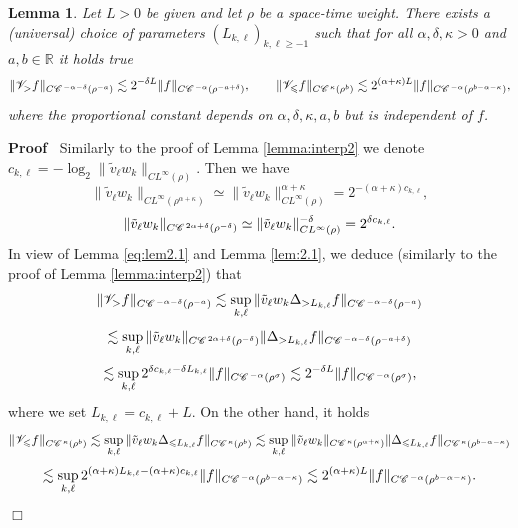 \documentclass[a4paper,11pt]{article}
\renewcommand{\geq}{\geqslant}
\newenvironment{proof}{\noindent\textbf{Proof\ }}{\hspace*{\fill}$\Box$\medskip}
\newtheorem{lemma}[theorem]{Lemma}
\numberwithin{equation}{section}
\newcommand{\CC}{\mathscr{C} \hspace{.1em}}
\newcommand{\VV}{\mathscr{V}}
\newcommand{\R}{\mathbb{R}}
\newcommand{\8}{\infty}
\begin{document}
\begin{lemma}\label{lem:local2}
Let $L>0$ be given and  let $\rho$ be a space-time weight. There exists a (universal) choice of parameters $(L_{k,\ell})_{k,\ell\geq -1}$ such that for all $\alpha,\delta,\kappa>0$ and $a,b\in\R$ it holds true
      \[ \| \VV_{>} f \|_{C\CC^{- \alpha - \delta} (\rho^{- a})} \lesssim 2^{- \delta L} \| f \|_{C\CC^{- \alpha}
     (\rho^{-a+\delta})}, \qquad \| \VV_{\leqslant} f \|_{C\CC^{\kappa}
     (\rho^{b})} \lesssim 2^{(\alpha + \kappa)
     L} \| f \|_{C\CC^{- \alpha} (\rho^{b-\alpha-\kappa})}, \]
          where the proportional constant depends on $\alpha,\delta,\kappa,a,b$ but is independent of $f$.
\end{lemma}

\begin{proof}
Similarly to the proof of Lemma \ref{lemma:interp2} we denote $c_{k,\ell} = - \log_2 \|\tilde v_{\ell}  w_k \|_{CL^{\infty} (\rho)}$.
  Then we have
  \[ \|\tilde v_{\ell}  w_k \|_{CL^{\infty} (\rho^{\alpha+\kappa})} \simeq \|\tilde v_{\ell}  w_k \|_{CL^{\infty}
     (\rho)}^{\alpha+\kappa} = 2^{- (\alpha+\kappa) c_{k,\ell}}, \]
  \[ \|\tilde v_{\ell}  w_k \|_{C\CC^{2 \alpha + \delta} (\rho^{- \delta})} \simeq \|\tilde v_{\ell}  w_k
     \|_{CL^{\infty} (\rho)}^{- \delta} = 2^{\delta c_{k,\ell}} . \]
In view of Lemma \eqref{eq:lem2.1} and Lemma \ref{lem:2.1}, we deduce (similarly to the proof of Lemma \ref{lemma:interp2}) that
  \[ \| \VV_{>} f \|_{C\CC^{- \alpha - \delta} (\rho^{- a})} \lesssim
     \sup_{k,\ell} \|\tilde v_{\ell}  w_k \Delta_{> L_{k,\ell}} f \|_{C\CC^{- \alpha - \delta} (\rho^{- a})}
    \]
    \[ \lesssim \sup_{k,\ell} \|\tilde v_{\ell}  w_k \|_{C\CC^{2 \alpha + \delta} (\rho^{-\delta})}
     \| \Delta_{> L_{k,\ell}} f \|_{C\CC^{- \alpha - \delta} (\rho^{-a+\delta})} \]
  \[ \lesssim \sup_{k,\ell} 2^{\delta c_{k,\ell} - \delta L_{k,\ell}} \| f \|_{C\CC^{- \alpha}
     (\rho^{\sigma})} \lesssim 2^{- \delta L} \| f \|_{C\CC^{- \alpha}
     (\rho^{\sigma})}, \]
where we set $L_{k,\ell} =  c_{k,\ell}+ L$.
  On the other hand, it holds
  \[ \| \VV_{\leqslant} f \|_{C\CC^{\kappa} (\rho^b)} \lesssim \sup_{k,\ell}
     \|\tilde v_{\ell}  w_k \Delta_{\leqslant L_{k,\ell}} f \|_{C\CC^{\kappa} (\rho^b)} \lesssim
     \sup_{k,\ell} \|\tilde v_{\ell}  w_k \|_{C\CC^{\kappa} (\rho^{\alpha+\kappa})} \| \Delta_{\leqslant
     L_{k,\ell}} f \|_{C\CC^{\kappa} (\rho^{b-\alpha-\kappa})} \]
  \[ \lesssim \sup_{k,\ell} 2^{(\alpha + \kappa) L_{k,\ell} - (\alpha+\kappa) c_{k,\ell}} \| f
     \|_{C\CC^{- \alpha} (\rho^{b-\alpha-\kappa})} \lesssim 2^{(\alpha+\kappa) L} \| f \|_{C\CC^{- \alpha}
     (\rho^{b-\alpha-\kappa})}.\]
\end{proof}
\end{document}

